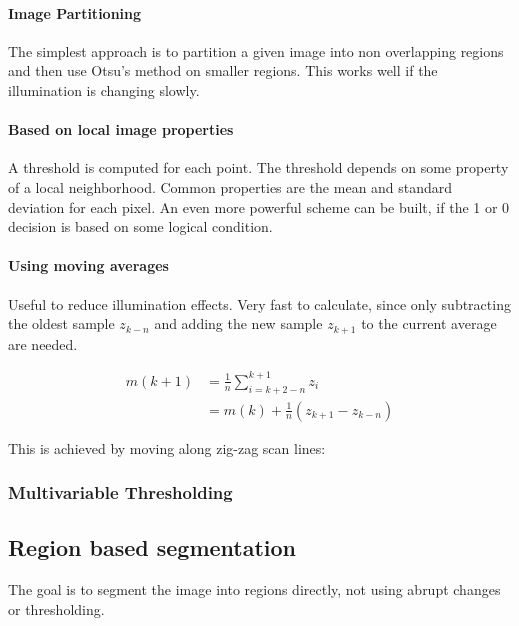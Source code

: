 \paragraph{Image Partitioning}
The simplest approach is to partition a given image into non overlapping regions and then use Otsu's method on smaller regions. 
This works well if the illumination is changing slowly. \\
\paragraph{Based on local image properties}
A threshold is computed for each point. The threshold depends on some property of a local neighborhood. Common properties are the mean and standard deviation for each pixel.
An even more powerful scheme can be built, if the 1 or 0 decision is based on some logical condition.\\
\paragraph{Using moving averages}
Useful to reduce illumination effects.
Very fast to calculate, since only subtracting the oldest sample $z_{k-n}$ and
adding the new sample $z_{k+1}$ to the current average are needed.

\begin{align*}
	m(k+1) &= \frac{1}{n} \sum_{i=k+2-n}^{k+1} z_i \\
	&= m(k) + \frac{1}{n}(z_{k+1}-z_{k-n})
\end{align*}

This is achieved by moving along zig-zag scan lines:
\begin{center}
\end{center}

\subsubsection{Multivariable Thresholding}

\subsection{Region based segmentation}
The goal is to segment the image into regions directly, not using abrupt changes or thresholding.
